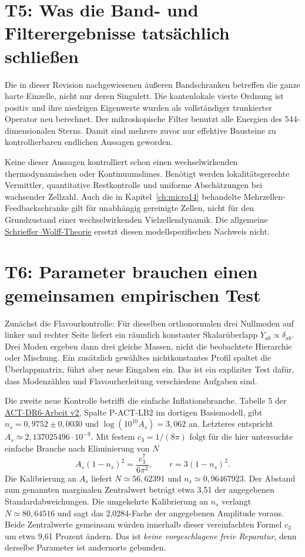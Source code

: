 \section{T5: Was die Band- und Filterergebnisse tatsächlich schließen}
Die in dieser Revision nachgewiesenen äußeren Bandschranken betreffen die ganze harte Einzelle, nicht nur deren Singulett. Die kantenlokale vierte Ordnung ist positiv und ihre niedrigen Eigenwerte wurden als vollständiger trunkierter Operator neu berechnet. Der mikroskopische Filter benutzt alle Energien des 544-dimensionalen Sterns. Damit sind mehrere zuvor nur effektive Bausteine zu kontrollierbaren endlichen Aussagen geworden.

Keine dieser Aussagen kontrolliert schon einen wechselwirkenden thermodynamischen oder Kontinuumslimes. Benötigt werden lokalitätsgerechte Vermittler, quantitative Restkontrolle und uniforme Abschätzungen bei wachsender Zellzahl. Auch die in Kapitel~\ref{ch:micro14} behandelte Mehrzellen-Feedbackschranke gilt für unabhängig gereinigte Zellen, nicht für den Grundzustand einer wechselwirkenden Vielzellendynamik. Die allgemeine \href{https://arxiv.org/abs/1105.0675}{Schrieffer--Wolff-Theorie} ersetzt diesen modellspezifischen Nachweis nicht.

\section{T6: Parameter brauchen einen gemeinsamen empirischen Test}
Zunächst die Flavourkontrolle: Für dieselben orthonormalen drei Nullmoden auf linker und rechter Seite liefert ein räumlich konstanter Skalarüberlapp $Y_{ab}\propto\delta_{ab}$. Drei Moden ergeben dann drei gleiche Massen, nicht die beobachtete Hierarchie oder Mischung. Ein zusätzlich gewähltes nichtkonstantes Profil spaltet die Überlappmatrix, führt aber neue Eingaben ein. Das ist ein expliziter Test dafür, dass Modenzählen und Flavourherleitung verschiedene Aufgaben sind.

Die zweite neue Kontrolle betrifft die einfache Inflationsbranche. Tabelle 5 der \href{https://arxiv.org/abs/2503.14452v2}{ACT-DR6-Arbeit v2}, Spalte P-ACT-LB2 im dortigen Basismodell, gibt $n_s=0{,}9752\pm0{,}0030$ und $\log(10^{10}A_s)=3{,}062$ an. Letzteres entspricht $A_s\simeq2{,}137025496\cdot10^{-9}$. Mit festem $c_3=1/(8\pi)$ folgt für die hier untersuchte einfache Branche nach Eliminierung von $N$
\begin{equation}
A_s(1-n_s)^2=\frac{c_3^7}{6\pi^2},\qquad r=3(1-n_s)^2.
\end{equation}
Die Kalibrierung an $A_s$ liefert $N\simeq56{,}62391$ und $n_s\simeq0{,}96467923$. Der Abstand zum genannten marginalen Zentralwert beträgt etwa 3,51 der angegebenen Standardabweichungen. Die umgekehrte Kalibrierung an $n_s$ verlangt $N\simeq80{,}64516$ und sagt das 2,0284-Fache der angegebenen Amplitude voraus. Beide Zentralwerte gemeinsam würden innerhalb dieser vereinfachten Formel $c_3$ um etwa 9,61 Prozent ändern. Das ist \emph{keine vorgeschlagene freie Reparatur}, denn derselbe Parameter ist andernorts gebunden.


